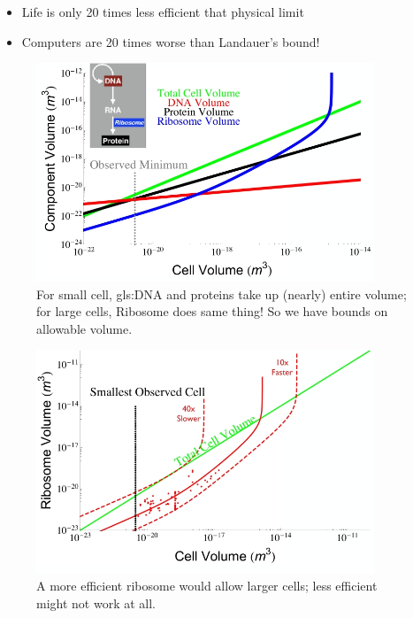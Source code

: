 \documentclass[]{article}
\begin{document}
\begin{itemize}
	\item Life is only 20 times less efficient that physical limit\cite{kempes2017thermodynamic}
	\item Computers are 20 times worse than Landauer's bound!
\end{itemize}

\begin{figure}[H]
	\caption[For small cell, DNA and proteins take up (nearly) entire volume]{For small cell, \gls{gls:DNA} and proteins take up (nearly) entire volume; for large cells, Ribosome does same thing! So we have bounds on allowable volume.\cite{kempes2016evolutionary}}\label{fig:RibosomeTradeoffs} 
	\includegraphics[width=0.9\textwidth]{RibosomeTradeoffs}
\end{figure}

\begin{figure}[H]
	\caption[A more efficient ribosome would allow larger cells]{A more efficient ribosome would allow larger cells; less efficient might not work at all.}\label{fig:RibosomeTradeoffsEarly} 
	\includegraphics[width=0.9\textwidth]{RibosomeTradeoffsEarly}
\end{figure}
\end{document}
